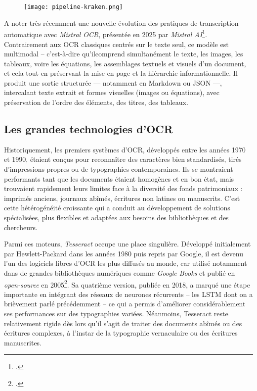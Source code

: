 \begin{figure}[htbp]
\centering
\texttt{[image: pipeline-kraken.png]}
\caption{}
\label{fig:pipeline-kraken}
\end{figure}

A noter très récemment une nouvelle évolution des pratiques de transcription automatique avec \emph{Mistral OCR}, présentée en 2025 par \emph{Mistral AI}\footcite[][]{mistralocr}. Contrairement aux OCR classiques centrés sur le texte seul, ce modèle est multimodal -- c'est-à-dire qu'ilcomprend simultanément le texte, les images, les tableaux, voire les équations, les assemblages textuels et visuels d’un document, et cela tout en préservant la mise en page et la hiérarchie informationnelle. Il produit une sortie structurée — notamment en Markdown ou JSON —, intercalant texte extrait et formes visuelles (images ou équations), avec préservation de l’ordre des éléments, des titres, des tableaux.

\subsection{Les grandes technologies d'OCR}

Historiquement, les premiers systèmes d’OCR, développés entre les années 1970 et 1990, étaient conçus pour reconnaître des caractères bien standardisés, tirés d’impressions propres ou de typographies contemporaines. Ils se montraient performants tant que les documents étaient homogènes et en bon état, mais trouvaient rapidement leurs limites face à la diversité des fonds patrimoniaux : imprimés anciens, journaux abîmés, écritures non latines ou manuscrits. C’est cette hétérogénéité croissante qui a conduit au développement de solutions spécialisées, plus flexibles et adaptées aux besoins des bibliothèques et des chercheurs.

Parmi ces moteurs, \emph{Tesseract} occupe une place singulière. Développé initialement par Hewlett-Packard dans les années 1980 puis repris par Google, il est devenu l’un des logiciels libres d’OCR les plus diffusés au monde, car utilisé notamment dans de grandes bibliothèques numériques comme \emph{Google Books} et publié en \emph{open-source} en 2005\footcite[][]{smith}. Sa quatrième version, publiée en 2018, a marqué une étape importante en intégrant des réseaux de neurones récurrents -- les LSTM dont on a brièvement parlé précédemment -- ce qui a permis d’améliorer considérablement ses performances sur des typographies variées. Néanmoins, Tesseract reste relativement rigide dès lors qu’il s’agit de traiter des documents abîmés ou des écritures complexes, à l'instar de la typographie vernaculaire ou des écritures manuscrites.

